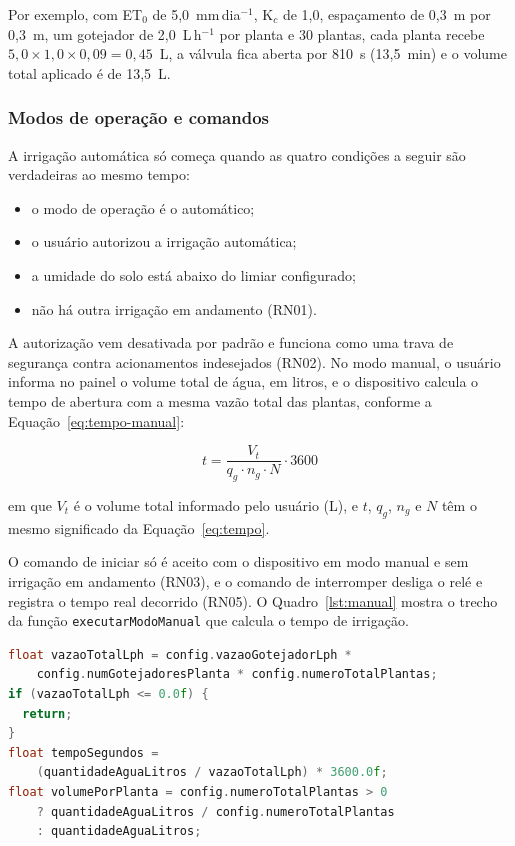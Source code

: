 Por exemplo, com ET$_0$ de 5,0~mm\,dia$^{-1}$, K$_c$ de 1,0, espaçamento de 0,3~m por 0,3~m, um gotejador de 2,0~L\,h$^{-1}$ por planta e 30 plantas, cada planta recebe $5{,}0 \times 1{,}0 \times 0{,}09 = 0{,}45$~L, a válvula fica aberta por 810~s (13,5~min) e o volume total aplicado é de 13,5~L.

\subsubsection{Modos de operação e comandos}

A irrigação automática só começa quando as quatro condições a seguir são verdadeiras ao mesmo tempo:
\begin{itemize}
    \item o modo de operação é o automático;
    \item o usuário autorizou a irrigação automática;
    \item a umidade do solo está abaixo do limiar configurado;
    \item não há outra irrigação em andamento (RN01).
\end{itemize}

A autorização vem desativada por padrão e funciona como uma trava de segurança contra acionamentos indesejados (RN02). No modo manual, o usuário informa no painel o volume total de água, em litros, e o dispositivo calcula o tempo de abertura com a mesma vazão total das plantas, conforme a Equação~\ref{eq:tempo-manual}:

\begin{equation}
  t = \frac{V_t}{q_g \cdot n_g \cdot N} \cdot 3600
  \label{eq:tempo-manual}
\end{equation}

\noindent em que $V_t$ é o volume total informado pelo usuário (L), e $t$, $q_g$, $n_g$ e $N$ têm o mesmo significado da Equação~\ref{eq:tempo}.

O comando de iniciar só é aceito com o dispositivo em modo manual e sem irrigação em andamento (RN03), e o comando de interromper desliga o relé e registra o tempo real decorrido (RN05). O Quadro~\ref{lst:manual} mostra o trecho da função \texttt{executarModoManual} que calcula o tempo de irrigação.

\vspace{0.6\baselineskip}
\noindent\begin{minipage}{\linewidth}
\begin{lstlisting}[language=C++, caption={Cálculo do tempo de irrigação no modo manual (trecho de executarModoManual)}, label={lst:manual}]
float vazaoTotalLph = config.vazaoGotejadorLph *
    config.numGotejadoresPlanta * config.numeroTotalPlantas;
if (vazaoTotalLph <= 0.0f) {
  return;
}
float tempoSegundos =
    (quantidadeAguaLitros / vazaoTotalLph) * 3600.0f;
float volumePorPlanta = config.numeroTotalPlantas > 0
    ? quantidadeAguaLitros / config.numeroTotalPlantas
    : quantidadeAguaLitros;
\end{lstlisting}
\vspace{-0.5\baselineskip}
\end{minipage}
\medskip

